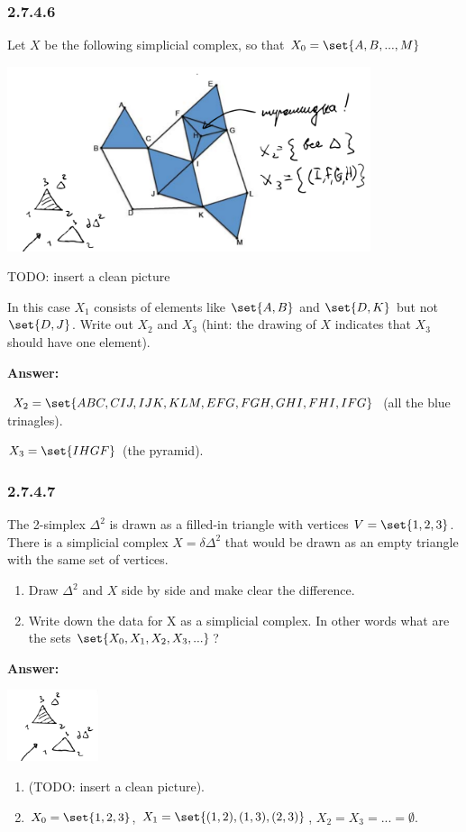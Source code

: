 \documentclass{article}
\newcommand{\N}{\mathbb{N}}
\newcommand{\Pow}{\mathbb{P}}
\newcommand{\vsp}[0]{\vspace*{10pt}\par}
\newcommand{\exercise}[1]{\subsubsection*{#1}}
\newcommand{\ans}[0]{\vsp\textbf{Answer: }\vsp}
\newcommand{\U}[1]{{\underline{#1}}}
\newcommand{\ei}{\item}
\newcommand{\es}{\begin{enumerate}[label=(\alph*)]\ei}
\newcommand{\ee}{\end{enumerate}}
\begin{document}

\exercise{2.7.4.6}

Let $X$ be the following simplicial complex, so that $X_0 = \set{A, B, ... , M}$

\begin{center}
\includegraphics[width=0.8\textwidth]{img/simplicial_complex.png}
\end{center}

TODO: insert a clean picture

In this case $X_1$ consists of elements like $\set{A,B}$ and $\set{D,K}$ but not
$\set{D,J}$.  Write out $X_2$ and $X_3$ (hint: the drawing of $X$ indicates that
$X_3$ should have one element).

\ans

$X_2 = \set{ABC, CIJ, IJK, KLM, EFG, FGH, GHI, FHI, IFG}$ (all the blue
trinagles).

$X_3 = \set{IHGF}$ (the pyramid).

\exercise{2.7.4.7}

The 2-simplex $\Delta^2$ is drawn as a filled-in triangle with vertices $V =
\set{1, 2, 3}$. There is a simplicial complex $X = \delta \Delta^2$ that would
be drawn as an empty triangle with the same set of vertices.

\es Draw $\Delta^2$ and $X$ side by side and make clear the difference.
\ei Write down the data for X as a simplicial complex. In other words what are
    the sets $\set{X_0, X_1, X_2, X_3, ...}$?
\ee

\ans
\begin{center}
\includegraphics[width=0.2\textwidth]{img/simplicial_complex_example.png}
\end{center}
\es (TODO: insert a clean picture).
\ei $X_0 = \set{1,2,3}$, $X_1 = \set{(1,2), (1,3), (2,3)}$, $X_2 = X_3 = ... =
    \emptyset$.
\ee
\end{document}
